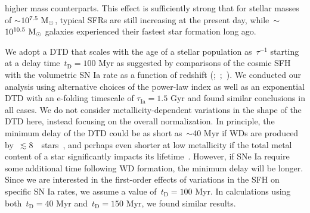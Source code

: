\documentclass[foo.tex]{subfiles}
\begin{document}
higher mass counterparts.
This effect is sufficiently strong that for stellar masses of
$\sim$$10^{7.5}~\text{M}_\odot$, typical SFRs are still increasing at the present day,
while~$\sim$$10^{10.5}~\text{M}_\odot$ galaxies experienced their fastest star formation
long ago.
\par
We adopt a DTD that scales with the age of a stellar population as~$\tau^{-1}$
starting at a delay time~$t_\text{D} = 100$ Myr as suggested by comparisons of
the cosmic SFH with the volumetric SN Ia rate as a function of redshift
(\citealp{Maoz2012a};~\citealp*{Maoz2012b};~\citealp{Graur2013, Graur2014}).
We conducted our analysis using alternative choices of the power-law
index as well as an exponential DTD with an e-folding timescale of
$\tau_\text{Ia} = 1.5$ Gyr and found similar conclusions in all cases.
We do not consider metallicity-dependent variations in the shape of the DTD
here, instead focusing on the overall normalization.
In principle, the minimum delay of the DTD could be as short as~$\sim$40 Myr if
WDs are produced by~$\lesssim$8~\msun~stars~\citep*[e.g.,][]{Hurley2000}, and
perhaps even shorter at low metallicity if the total metal content of a star
significantly impacts its lifetime~\citep[e.g.,][]{Kodama1997, Vincenzo2016}.
However, if SNe Ia require some additional time following WD formation, the
minimum delay will be longer.
Since we are interested in the first-order effects of variations in the SFH on
specific SN Ia rates, we assume a value of~$t_\text{D} = 100$ Myr.
In calculations using both~$t_\text{D} = 40$ Myr and~$t_\text{D} = 150$ Myr,
we found similar results.
\par
\end{document}
